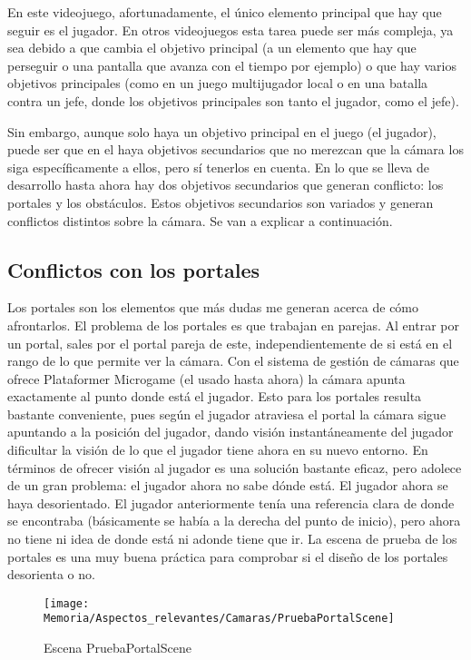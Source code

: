 En este videojuego, afortunadamente, el único elemento principal que hay que seguir es el jugador. En otros videojuegos esta tarea puede ser más compleja, ya sea debido a que cambia el objetivo principal (a un elemento que hay que perseguir o una pantalla que avanza con el tiempo por ejemplo) o que hay varios objetivos principales (como en un juego multijugador local o en una batalla contra un jefe, donde los objetivos principales son tanto el jugador, como el jefe).

Sin embargo, aunque solo haya un objetivo principal en el juego (el jugador), puede ser que en el haya objetivos secundarios que no merezcan que la cámara los siga específicamente a ellos, pero sí tenerlos en cuenta. En lo que se lleva de desarrollo hasta ahora hay dos objetivos secundarios que generan conflicto: los portales y los obstáculos. Estos objetivos secundarios son variados y generan conflictos distintos sobre la cámara. Se van a explicar a continuación.

\subsection{Conflictos con los portales}
Los portales son los elementos que más dudas me generan acerca de cómo afrontarlos. El problema de los portales es que trabajan en parejas. Al entrar por un portal, sales por el portal pareja de este, independientemente de si está en el rango de lo que permite ver la cámara. Con el sistema de gestión de cámaras que ofrece Plataformer Microgame (el usado hasta ahora) la cámara apunta exactamente al punto donde está el jugador. Esto para los portales resulta bastante conveniente, pues según el jugador atraviesa el portal la cámara sigue apuntando a la posición del jugador, dando visión instantáneamente del jugador dificultar la visión de lo que el jugador tiene ahora en su nuevo entorno. En términos de ofrecer visión al jugador es una solución bastante eficaz, pero adolece de un gran problema: el jugador ahora no sabe dónde está. El jugador ahora se haya desorientado. El jugador anteriormente tenía una referencia clara de donde se encontraba (básicamente se había a la derecha del punto de inicio), pero ahora no tiene ni idea de donde está ni adonde tiene que ir. La escena de prueba de los portales es una muy buena práctica para comprobar si el diseño de los portales desorienta o no.

\clearpage
\begin{figure}[h]
\texttt{[image: Memoria/Aspectos\_relevantes/Camaras/PruebaPortalScene]}
\caption{Escena PruebaPortalScene}
\end{figure}

